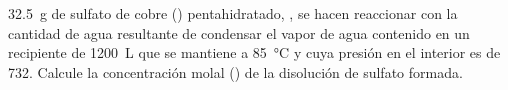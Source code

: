\SI{32,5}{\gram} de sulfato de cobre () pentahidratado, , se hacen reaccionar con la cantidad de agua resultante de condensar el vapor de agua contenido en un recipiente de \SI{1200}{\liter} que se mantiene a \SI{85}{\celsius} y cuya presión en el interior es de \SI{732}{\torr}. Calcule la concentración molal (\si{\Molal}) de la disolución de sulfato formada.